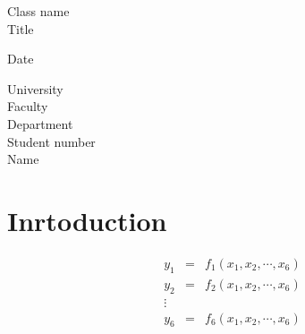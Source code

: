 \documentclass [titlepage, a4j, 11pt] {jsarticle}
\begin{document}
\begin {titlepage}
	\begin {center}
		\vspace {20mm}
		{\Large Class name} \\
		\vspace {5mm}
		\vspace {60mm}
		{\huge Title} 
		
		\vspace {100mm}
		{\Large Date} \\
		\vspace {15mm}
	
	{\Large University} \\
	{\Large Faculty} \\
	{\Large Department} \\
	{\Large Student number} \\
	{\Large Name} \\
	\end {center}
\end {titlepage}







\setcounter{page}{1}
\section{Inrtoduction}
\begin{eqnarray}
y_1&=&f_1(x_1,x_2,\cdots,x_6) \nonumber \\
y_2&=&f_2(x_1,x_2,\cdots,x_6)\nonumber \\
\vdots \\
y_6&=&f_6(x_1,x_2,\cdots,x_6)\nonumber 
\end{eqnarray}
\end{document}
